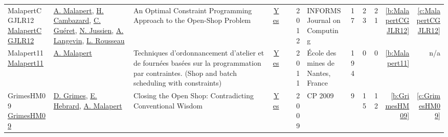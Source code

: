 {\begin{longtable}{>{\raggedright\arraybackslash}p{3cm}>{\raggedright\arraybackslash}p{6cm}>{\raggedright\arraybackslash}p{6.5cm}rrrp{2.5cm}rrrrr}
MalapertCGJLR12 \href{https://doi.org/10.1287/ijoc.1100.0446}{MalapertCGJLR12} & \hyperref[auth:a82]{A. Malapert}, \hyperref[auth:a1025]{H. Cambazard}, \hyperref[auth:a296]{C. Gu{\'{e}}ret}, \hyperref[auth:a250]{N. Jussien}, \hyperref[auth:a655]{A. Langevin}, \hyperref[auth:a332]{L. Rousseau} & An Optimal Constraint Programming Approach to the Open-Shop Problem & \href{../works/MalapertCGJLR12.pdf}{Yes} & \cite{MalapertCGJLR12} & 2012 & INFORMS Journal on Computing & 17 & 23 & 21 & \ref{b:MalapertCGJLR12} & \ref{c:MalapertCGJLR12}\\
Malapert11 \href{https://tel.archives-ouvertes.fr/tel-00630122}{Malapert11} & \hyperref[auth:a82]{A. Malapert} & Techniques d'ordonnancement d'atelier et de fourn{\'{e}}es bas{\'{e}}es sur la programmation par contraintes. (Shop and batch scheduling with constraints) & \href{../works/Malapert11.pdf}{Yes} & \cite{Malapert11} & 2011 & {\'{E}}cole des mines de Nantes, France & 194 & 0 & 0 & \ref{b:Malapert11} & n/a\\
GrimesHM09 \href{https://doi.org/10.1007/978-3-642-04244-7\_33}{GrimesHM09} & \hyperref[auth:a183]{D. Grimes}, \hyperref[auth:a1]{E. Hebrard}, \hyperref[auth:a82]{A. Malapert} & Closing the Open Shop: Contradicting Conventional Wisdom & \href{../works/GrimesHM09.pdf}{Yes} & \cite{GrimesHM09} & 2009 & CP 2009 & 9 & 15 & 12 & \ref{b:GrimesHM09} & \ref{c:GrimesHM09}\\
\end{longtable}
}

\clearpage
